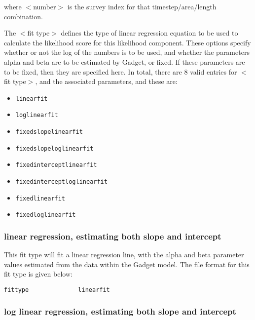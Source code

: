 \documentclass[]{book}
\providecommand{\tightlist}{%
  \setlength{\itemsep}{0pt}\setlength{\parskip}{0pt}}
\begin{document}
where \(<\)number\(>\) is the survey index for that timestep/area/length
combination.

The \(<\)fit type\(>\) defines the type of linear regression equation to be
used to calculate the likelihood score for this likelihood component.
These options specify whether or not the log of the numbers is to be
used, and whether the parameters alpha and beta are to be estimated by
Gadget, or fixed. If these parameters are to be fixed, then they are
specified here. In total, there are 8 valid entries for \(<\)fit type\(>\),
and the associated parameters, and these are:

\begin{itemize}
\tightlist
\item
  \texttt{linearfit}
\item
  \texttt{loglinearfit}
\item
  \texttt{fixedslopelinearfit}
\item
  \texttt{fixedslopeloglinearfit}
\item
  \texttt{fixedinterceptlinearfit}
\item
  \texttt{fixedinterceptloglinearfit}
\item
  \texttt{fixedlinearfit}
\item
  \texttt{fixedloglinearfit}
\end{itemize}

\hypertarget{linear-regression-estimating-both-slope-and-intercept}{%
\subsubsection{linear regression, estimating both slope and intercept}\label{linear-regression-estimating-both-slope-and-intercept}}

This fit type will fit a linear regression line, with the alpha and beta
parameter values estimated from the data within the Gadget model. The
file format for this fit type is given below:

\begin{verbatim}
fittype              linearfit
\end{verbatim}

\hypertarget{log-linear-regression-estimating-both-slope-and-intercept}{%
\subsubsection{log linear regression, estimating both slope and intercept}\label{log-linear-regression-estimating-both-slope-and-intercept}}
\end{document}
